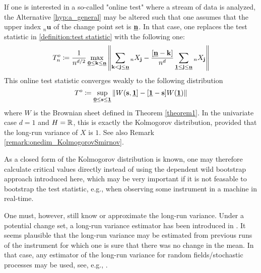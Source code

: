 If one is interested in a so-called "online test" where a stream of data is analyzed, the Alternative \ref{hyp:a_general} may be altered such that one assumes that the upper index ${}_{n}\mathbf{u}$ of the change point set is $\usbf[n]$. In that case, one replaces the test statistic in \ref{definition:test statistic} with the following one:
\[ T_n^o \coloneqq \frac{1}{n^{d/2}} \max\limits_{\usbf[0] \leq \mathbf{k} \leq \usbf[n]} \left\| \sum\limits_{\mathbf{k} < \mathbf{j} \leq \usbf[n]} {}_{n}X_\mathbf{j} - \frac{[\usbf[n] - \mathbf{k}]}{n^d} \sum\limits_{\usbf[1] \leq \mathbf{j} \leq \usbf[n]} {}_{n}X_\mathbf{j} \right\| \]
This online test statistic converges weakly to the following distribution
\[ T^o \coloneqq \sup\limits_{\usbf[0] \leq \mathbf{s} \leq \usbf[1]} \| W(\mathbf{s}, \usbf[1]] - [\usbf[1] - \mathbf{s}] W(\usbf[1]) \| \]
where $W$ is the Brownian sheet defined in Theorem \ref{theorem1}. In the univariate case $d=1$ and $H=\mathbb{R}$, this is exactly the Kolmogorov distribution, provided that the long-run variance of $X$ is $1$. See also Remark \ref{remark:onedim_KolmogorovSmirnov}. 

As a closed form of the Kolmogorov distribution is known, one may therefore calculate critical values directly instead of using the dependent wild bootstrap approach introduced here, which may be very important if it is not feasable to bootstrap the test statistic, e.g., when observing some instrument in a machine in real-time. 

One must, however, still know or approximate the long-run variance. Under a potential change set, a long-run variance estimator has been introduced in \cite{[8]BUCCHIA2015104}. It seems plausible that the long-run variance may be estimated from previous runs of the instrument for which one is sure that there was no change in the mean. In that case, any estimator of the long-run variance for random fields/stochastic processes may be used, see, e.g., \cite{muller2007lrv}.
